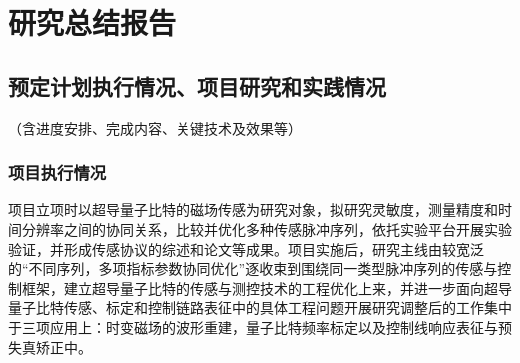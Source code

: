 \documentclass[a4paper,12pt]{article}
\begin{document}
\section{研究总结报告}

\subsection{预定计划执行情况、项目研究和实践情况}
（含进度安排、完成内容、关键技术及效果等）
\subsubsection{项目执行情况}
项目立项时以超导量子比特的磁场传感为研究对象，拟研究灵敏度，测量精度和时间分辨率之间的协同关系，比较并优化多种传感脉冲序列，依托实验平台开展实验验证，并形成传感协议的综述和论文等成果。项目实施后，研究主线由较宽泛的“不同序列，多项指标参数协同优化”逐收束到围绕同一类型脉冲序列的传感与控制框架，建立超导量子比特的传感与测控技术的工程优化上来，并进一步面向超导量子比特传感、标定和控制链路表征中的具体工程问题开展研究调整后的工作集中于三项应用上：时变磁场的波形重建，量子比特频率标定以及控制线响应表征与预失真矫正中。
\end{document}

